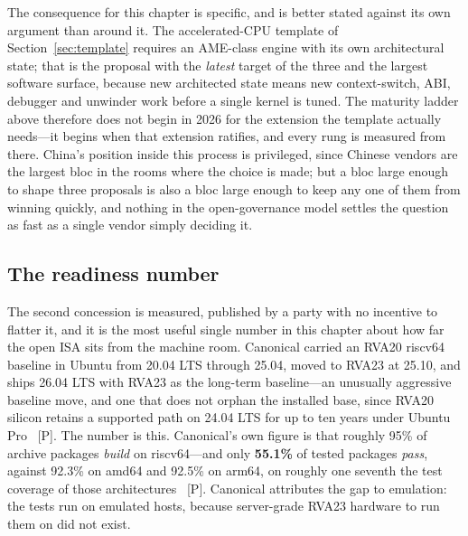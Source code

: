 The consequence for this chapter is specific, and is better stated against its own argument than around it. The accelerated-CPU template of Section~\ref{sec:template} requires an AME-class engine with its own architectural state; that is the proposal with the \emph{latest} target of the three and the largest software surface, because new architected state means new context-switch, ABI, debugger and unwinder work before a single kernel is tuned. The maturity ladder above therefore does not begin in 2026 for the extension the template actually needs---it begins when that extension ratifies, and every rung is measured from there. China's position inside this process is privileged, since Chinese vendors are the largest bloc in the rooms where the choice is made; but a bloc large enough to shape three proposals is also a bloc large enough to keep any one of them from winning quickly, and nothing in the open-governance model settles the question as fast as a single vendor simply deciding it.

\subsection{The readiness number}
\label{sec:riscv-readiness}

The second concession is measured, published by a party with no incentive to flatter it, and it is the most useful single number in this chapter about how far the open ISA sits from the machine room. Canonical carried an RVA20 riscv64 baseline in Ubuntu from 20.04 LTS through 25.04, moved to RVA23 at 25.10, and ships 26.04 LTS with RVA23 as the long-term baseline---an unusually aggressive baseline move, and one that does not orphan the installed base, since RVA20 silicon retains a supported path on 24.04 LTS for up to ten years under Ubuntu Pro~\cite{hc2026-canonical} [P]. The number is this. Canonical's own figure is that roughly 95\% of archive packages \emph{build} on riscv64---and only \textbf{55.1\%} of tested packages \emph{pass}, against 92.3\% on amd64 and 92.5\% on arm64, on roughly one seventh the test coverage of those architectures~\cite{hc2026-canonical} [P]. Canonical attributes the gap to emulation: the tests run on emulated hosts, because server-grade RVA23 hardware to run them on did not exist.

